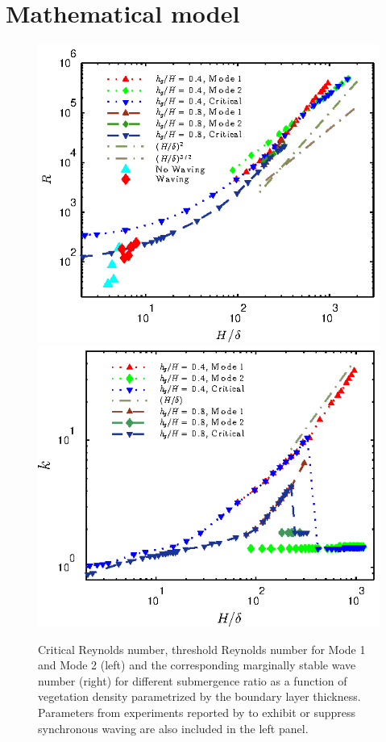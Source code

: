 \documentclass{jfm}
\renewcommand{\Rey}{{R}}
\begin{document}
\section{Mathematical model}
\begin{figure}
\begin{center}
\includegraphics[scale = 0.95]{fig2a}\includegraphics[scale = 0.95]{fig2b}
\end{center}
\caption{
Critical Reynolds number, threshold Reynolds number for Mode 1 and Mode 2 (left) and the corresponding marginally stable wave number (right) for different submergence ratio as a function of vegetation density parametrized by the boundary layer thickness. 
Parameters from experiments reported by \cite{Ghisal02} to exhibit or suppress synchronous waving are also included in the left panel. 
}
\label{Re_vs_delta}
\end{figure}
\end{document}
